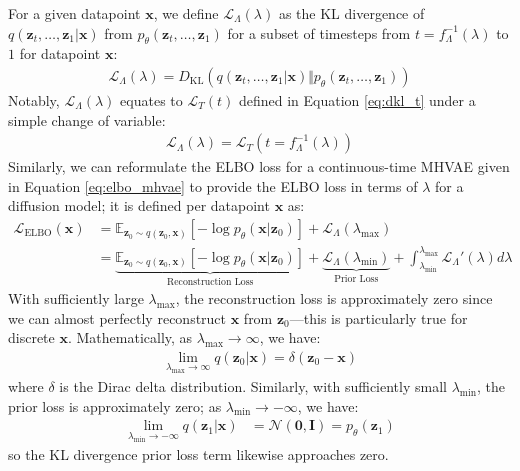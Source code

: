 \documentclass[ oneside,%
                    author={George Herbert},
                    degree={MSci},
                     title={Diffusion Models for Time-Evolving Precipitation Fields},
                  subtitle={}]{dissertation}
\begin{document}
For a given datapoint $\mathbf{x}$, we define $\mathcal{L}_\Lambda(\lambda)$ as the KL divergence of $q(\mathbf{z}_t,\ldots,\mathbf{z}_1|\mathbf{x})$ from $p_\theta(\mathbf{z}_t,\ldots,\mathbf{z}_1)$ for a subset of timesteps from $t=f_\Lambda^{-1}(\lambda)$ to $1$ for datapoint $\mathbf{x}$:
\begin{align}
      \mathcal{L}_\Lambda(\lambda)=D_{\mathrm{KL}}(q(\mathbf{z}_t,\ldots,\mathbf{z}_1|\mathbf{x})\Vert p_\theta(\mathbf{z}_t,\ldots,\mathbf{z}_1))
\end{align}
Notably, $\mathcal{L}_\Lambda(\lambda)$ equates to $\mathcal{L}_T(t)$ defined in Equation \ref{eq:dkl_t} under a simple change of variable:
\begin{align}
      \mathcal{L}_\Lambda(\lambda)=\mathcal{L}_T(t=f_\Lambda^{-1}(\lambda))
\end{align}
Similarly, we can reformulate the ELBO loss for a continuous-time MHVAE given in Equation \ref{eq:elbo_mhvae} to provide the ELBO loss in terms of $\lambda$ for a diffusion model; it is defined per datapoint $\mathbf{x}$ as:
\begin{align}
      \mathcal{L}_{\mathrm{ELBO}}(\mathbf{x})&=\mathbb{E}_{\mathbf{z}_0\sim q(\mathbf{z}_0,\mathbf{x})}\left[-\log p_\theta(\mathbf{x}|\mathbf{z}_0)\right]+\mathcal{L}_\Lambda(\lambda_{\max})\\
      &=\underbrace{\mathbb{E}_{\mathbf{z}_0\sim q(\mathbf{z}_0,\mathbf{x})}\left[-\log p_\theta(\mathbf{x}|\mathbf{z}_0)\right]}_{\text{Reconstruction Loss}}+\underbrace{\mathcal{L}_\Lambda(\lambda_{\min})}_{\text{Prior Loss}}+\int_{\lambda_{\min}}^{\lambda_{\max}}\mathcal{L}_\Lambda'(\lambda)d\lambda\label{eq:diffusion_elbo}
\end{align}
With sufficiently large $\lambda_{\max}$, the reconstruction loss is approximately zero since we can almost perfectly reconstruct $\mathbf{x}$ from $\mathbf{z}_0$---this is particularly true for discrete $\mathbf{x}$. Mathematically, as $\lambda_{\max}\to\infty$, we have:
\begin{align}
      \lim_{\lambda_{\max}\to\infty}q(\mathbf{z}_0|\mathbf{x})=\delta(\mathbf{z}_0-\mathbf{x})
\end{align}
where $\delta$ is the Dirac delta distribution. Similarly, with sufficiently small $\lambda_{\min}$, the prior loss is approximately zero; as $\lambda_{\min}\to-\infty$, we have:
\begin{align}
      \lim_{\lambda_{\min}\to -\infty} q(\mathbf{z}_1|\mathbf{x})&=\mathcal{N}(\mathbf{0}, \mathbf{I})=p_\theta(\mathbf{z}_1)
\end{align}
so the KL divergence prior loss term likewise approaches zero.
\end{document}
